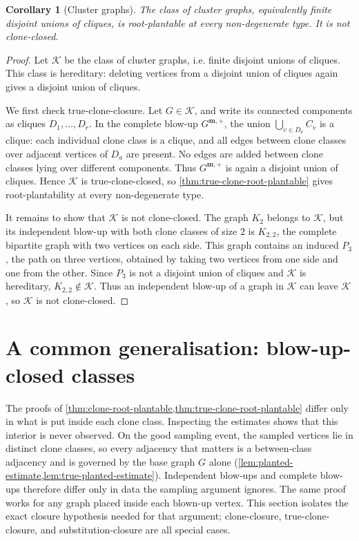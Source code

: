 \documentclass[11pt]{article}
\newtheorem{corollary}[corollary]{Corollary}
\theoremstyle{definition}
\newcommand{\K}{\mathcal{K}}
\begin{document}
\begin{corollary}[Cluster graphs]\label{cor:cluster-graphs}
The class of cluster graphs, equivalently finite disjoint unions of cliques, is
root-plantable at every non-degenerate type.  It is not clone-closed.
\end{corollary}

\begin{proof}
Let $\K$ be the class of cluster graphs, i.e. finite disjoint unions of cliques.
This class is hereditary: deleting vertices from a disjoint union of cliques
again gives a disjoint union of cliques.

We first check true-clone-closure.  Let $G\in\K$, and write its connected
components as cliques $D_1,\ldots,D_r$.  In the complete blow-up
$G^{\mathbf m,+}$, the union $\bigcup_{v\in D_a} C_v$ is a clique: each
individual clone class is a clique, and all edges between clone classes over
adjacent vertices of $D_a$ are present.  No edges are added between clone
classes lying over different components.  Thus $G^{\mathbf m,+}$ is again a
disjoint union of cliques.  Hence $\K$ is true-clone-closed, so
\cref{thm:true-clone-root-plantable} gives root-plantability at every
non-degenerate type.

It remains to show that $\K$ is not clone-closed.  The graph $K_2$ belongs to
$\K$, but its independent blow-up with both clone classes of size $2$ is
$K_{2,2}$, the complete bipartite graph with two vertices on each side.  This
graph contains an induced $P_3$, the path on three vertices, obtained by taking
two vertices from one side and one from the other.  Since $P_3$ is not a
disjoint union of cliques and $\K$ is hereditary, $K_{2,2}\notin\K$.  Thus an
independent blow-up of a graph in $\K$ can leave $\K$, so $\K$ is not
clone-closed.
\end{proof}

\section{A common generalisation: blow-up-closed classes}\label{sec:blowup-closed}

The proofs of \cref{thm:clone-root-plantable,thm:true-clone-root-plantable} differ only
in what is put inside each clone class.  Inspecting the estimates shows that this
interior is never observed.  On the good sampling event, the sampled vertices lie in
distinct clone classes, so every adjacency that matters is a between-class adjacency
and is governed by the base graph $G$ alone
(\cref{lem:planted-estimate,lem:true-planted-estimate}).  Independent blow-ups and
complete blow-ups therefore differ only in data the sampling argument ignores.  The same
proof works for any graph placed inside each blown-up vertex.  This section isolates the
exact closure hypothesis needed for that argument; clone-closure, true-clone-closure,
and substitution-closure are all special cases.
\end{document}
